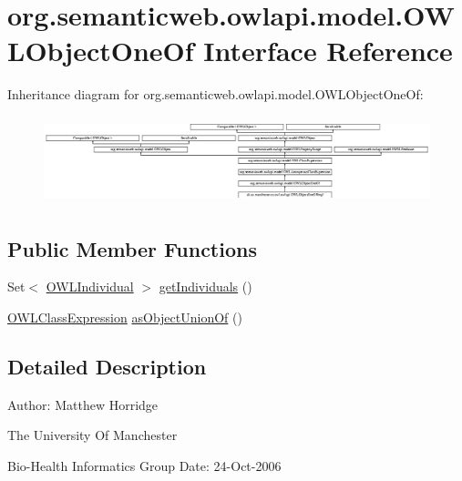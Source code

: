 \hypertarget{interfaceorg_1_1semanticweb_1_1owlapi_1_1model_1_1_o_w_l_object_one_of}{\section{org.\-semanticweb.\-owlapi.\-model.\-O\-W\-L\-Object\-One\-Of Interface Reference}
\label{interfaceorg_1_1semanticweb_1_1owlapi_1_1model_1_1_o_w_l_object_one_of}
}
Inheritance diagram for org.\-semanticweb.\-owlapi.\-model.\-O\-W\-L\-Object\-One\-Of\-:\begin{figure}[H]
\begin{center}
\leavevmode
\includegraphics[height=2.558747cm]{interfaceorg_1_1semanticweb_1_1owlapi_1_1model_1_1_o_w_l_object_one_of}
\end{center}
\end{figure}
\subsection*{Public Member Functions}
\begin{DoxyCompactItemize}
\item 
Set$<$ \hyperlink{interfaceorg_1_1semanticweb_1_1owlapi_1_1model_1_1_o_w_l_individual}{O\-W\-L\-Individual} $>$ \hyperlink{interfaceorg_1_1semanticweb_1_1owlapi_1_1model_1_1_o_w_l_object_one_of_a8e65ca23e36c64345db5cbddddad8500}{get\-Individuals} ()
\item 
\hyperlink{interfaceorg_1_1semanticweb_1_1owlapi_1_1model_1_1_o_w_l_class_expression}{O\-W\-L\-Class\-Expression} \hyperlink{interfaceorg_1_1semanticweb_1_1owlapi_1_1model_1_1_o_w_l_object_one_of_a19e7181995a312908257e53807961e9f}{as\-Object\-Union\-Of} ()
\end{DoxyCompactItemize}


\subsection{Detailed Description}
Author\-: Matthew Horridge\par
 The University Of Manchester\par
 Bio-\/\-Health Informatics Group Date\-: 24-\/\-Oct-\/2006 

